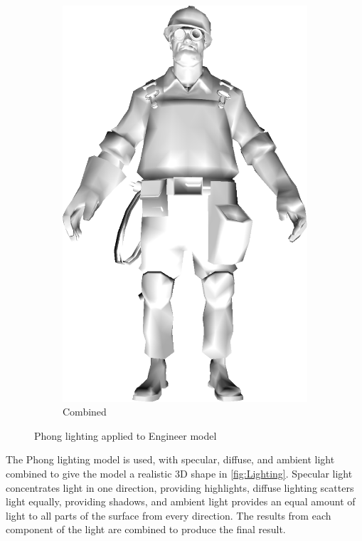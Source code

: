 \begin{figure}[h]
\begin{subfigure}[b]{0.18\textwidth}
        \includegraphics[width=\textwidth]{img/Lighting/combined.png}
        \caption{Combined}
        \label{fig:combined}
    \end{subfigure}
    \caption{Phong lighting applied to Engineer model}
    \label{fig:Lighting}
\end{figure}

The Phong lighting model is used, with specular, diffuse, and ambient light combined to give 
the model a realistic 3D shape in \autoref{fig:Lighting}. Specular light concentrates light in one direction, providing 
highlights, diffuse lighting scatters light equally, providing shadows, and ambient light provides 
an equal amount of light to all parts of the surface from every direction. The results from each component of the light are combined to produce the final result.


